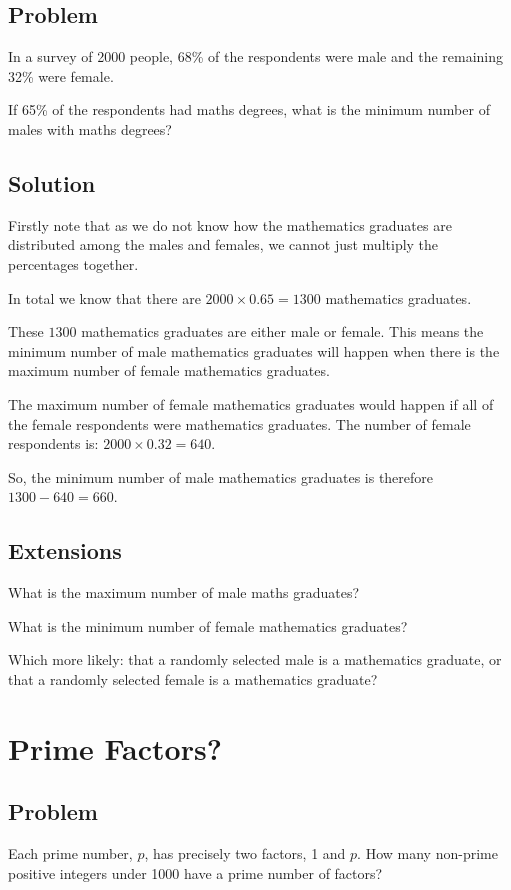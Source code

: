 \documentclass{book}
\begin{document}
\subsection{Problem}
In a survey of 2000 people, 68\% of the respondents were male and the remaining 32\% were female.

If 65\% of the respondents had maths degrees, what is the minimum number of males with maths degrees?
\subsection{Solution}
Firstly note that as we do not know how the mathematics graduates are distributed among the males and females, we cannot just multiply the percentages together.

In total we know that there are \(2000 \times 0.65=1300\) mathematics graduates.

These \(1300\) mathematics graduates are either male or female. This means the minimum number of male mathematics graduates will happen when there is the maximum number of female mathematics graduates.

The maximum number of female mathematics graduates would happen if all of the female respondents were mathematics graduates. The number of female respondents is: \(2000 \times 0.32 = 640\).

So, the minimum number of male mathematics graduates is therefore \(1300-640=\boxed{660}\).
\subsection{Extensions}
What is the maximum number of male maths graduates?

What is the minimum number of female mathematics graduates?

Which more likely: that a randomly selected male is a mathematics graduate, or that a randomly selected female is a mathematics graduate?
\newpage

\section{Prime Factors?}
\subsection{Problem}
Each prime number, \(p\), has precisely two factors, 1 and \(p\). How many non-prime positive integers under 1000 have a prime number of factors?
\end{document}
